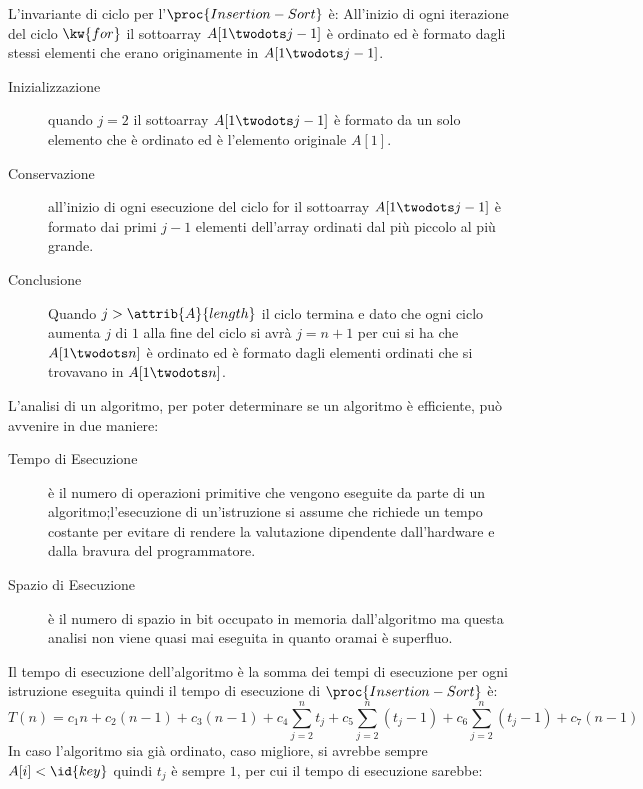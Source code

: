 L'invariante di ciclo per l'$\proc{Insertion-Sort}$ è:
All'inizio di ogni iterazione del ciclo $\kw{for}$ il sottoarray $A[1 \twodots j-1]$
è ordinato ed è formato dagli stessi elementi che erano originamente in $A[1\twodots j-1]$.
\begin{description}
  \item[Inizializzazione] quando $j = 2$ il sottoarray $A[1\twodots j-1]$ è formato
                           da un solo elemento che è ordinato ed è l'elemento originale $A[1]$.
  \item[Conservazione] all'inizio di ogni esecuzione del ciclo for il sottoarray $A[1 \twodots j-1]$
                        è formato dai primi $j-1$ elementi dell'array ordinati dal
                        più piccolo al più grande.

  \item[Conclusione] Quando $j > \attrib{A}{length}$ il ciclo termina e dato che ogni
                      ciclo aumenta $j$ di $1$ alla fine del ciclo si avrà $j = n + 1$
                      per cui si ha che $A[1\twodots n]$ è ordinato ed è formato
                      dagli elementi ordinati che si trovavano in $A[1 \twodots n]$.
\end{description}
L'analisi di un algoritmo, per poter determinare se un algoritmo è efficiente, può
avvenire in due maniere:
\begin{description}
    \item [Tempo di Esecuzione] è il numero di operazioni primitive che vengono eseguite da parte di un algoritmo;l'esecuzione di un'istruzione si assume che richiede un tempo costante
                                per evitare di rendere la valutazione dipendente dall'hardware e dalla bravura del programmatore.
    \item [Spazio di Esecuzione] è il numero di spazio in bit occupato in memoria dall'algoritmo ma questa analisi non viene quasi mai eseguita in quanto oramai è superfluo.
\end{description}
Il tempo di esecuzione dell'algoritmo è la somma dei tempi di esecuzione per ogni istruzione eseguita quindi il tempo di esecuzione di $\proc{Insertion-Sort}$ è:
\begin{equation*}
    T(n) = c_1n + c_2(n-1) + c_3(n-1) + c_4 \sum_{j=2} ^n t_j + c_5 \sum_{j=2} ^n (t_j -1)
         + c_6 \sum_{j=2} ^n (t_j -1) + c_7(n-1)
\end{equation*}
In caso l'algoritmo sia già ordinato, caso migliore, si avrebbe sempre $A[i] < \id{key}$ quindi $t_j$ è sempre $1$, per cui il tempo di esecuzione sarebbe:
